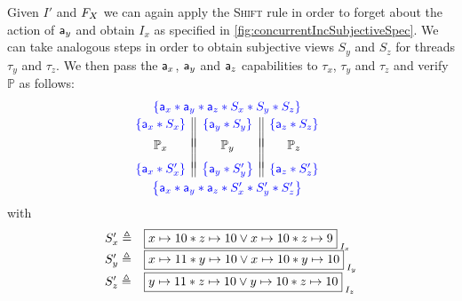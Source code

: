 Given $I'$ and $F_{X}$ we can again apply the \textsc{Shift} rule in order to forget about the action of $\mathsf{a}_y$ and obtain $I_x$ as specified in \fig\ref{fig:concurrentIncSubjectiveSpec}. We can take analogous steps in order to obtain subjective views $S_y$ and $S_z$ for threads $\tau_y$ and $\tau_z$. We then pass the $\mathsf{a}_x$, $\mathsf{a}_y$ and $\mathsf{a}_z$ capabilities to $\tau_x$, $\tau_y$ and $\tau_z$ and verify $\mathbb{P}$ as follows:
\[
\hspace*{-0.2cm}
\begin{array}{c}
	\color{blue}{\left\{\token a_x * \token a_y *  \token a_z *  S_x * S_y * S_z \right\}}\vspace*{2pt}\\
	
	\begin{array}{c || c || c}
		\color{blue}{\left\{\token a_x * S_x \right\}} & \color{blue}{\left\{\token a_y * S_y \right\}} & \color{blue}{\left\{\token a_z * S_z \right\}}\\
		&&\vspace*{-7pt}\\
		\mathbb{P}_x & \mathbb{P}_y & \mathbb{P}_z\\
		&&\vspace*{-5pt}\\

		\color{blue}{
			\left\{
					\token a_x * S'_x
			\right\}
		} 
		& 
		\color{blue}{
			\left\{
				\token a_y * S'_y
			\right\}
		} 

		&
		
		\color{blue}{
			\left\{
				\token a_z * S'_z
			\right\}
		} 		
		\vspace*{3pt}
	\end{array}\\
	\color{blue}{\left\{\token a_x * \token a_y *  \token a_z *  S'_x * S'_y * S'_z \right\}}\\
\end{array}
\]
with
\[
\begin{array}{l l}
	S'_x \eqdef & \shared{\cell{x}{10} * \cell{z}{10} \lor \cell{x}{10} * \cell{z}{9} }{I_x}\\
	S'_y \eqdef & \shared{\cell{x}{11} * \cell{y}{10} \lor \cell{x}{10} * \cell{y}{10} }{I_y}\\
	S'_z \eqdef & \shared{\cell{y}{11} * \cell{z}{10} \lor \cell{y}{10} * \cell{z}{10} }{I_z}
\end{array}
\]

